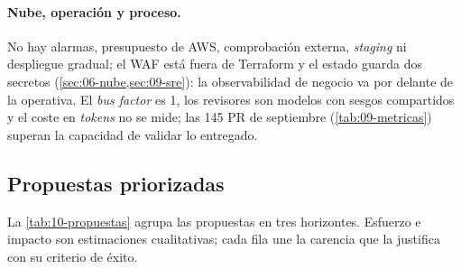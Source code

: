 \paragraph{Nube, operación y proceso.} No hay alarmas, presupuesto de AWS, comprobación externa,
\emph{staging} ni despliegue gradual; el WAF está fuera de Terraform y el estado guarda dos
secretos (\cref{sec:06-nube,sec:09-sre}): la observabilidad de negocio va por delante de la
operativa. El \emph{bus factor} es 1, los revisores son modelos con sesgos compartidos y el coste
en \emph{tokens} no se mide; las 145 PR de septiembre (\cref{tab:09-metricas}) superan la
capacidad de validar lo entregado.

\subsection{Propuestas priorizadas}

La \cref{tab:10-propuestas} agrupa las propuestas en tres horizontes. Esfuerzo e impacto son
estimaciones cualitativas; cada fila une la carencia que la justifica con su criterio de éxito.


